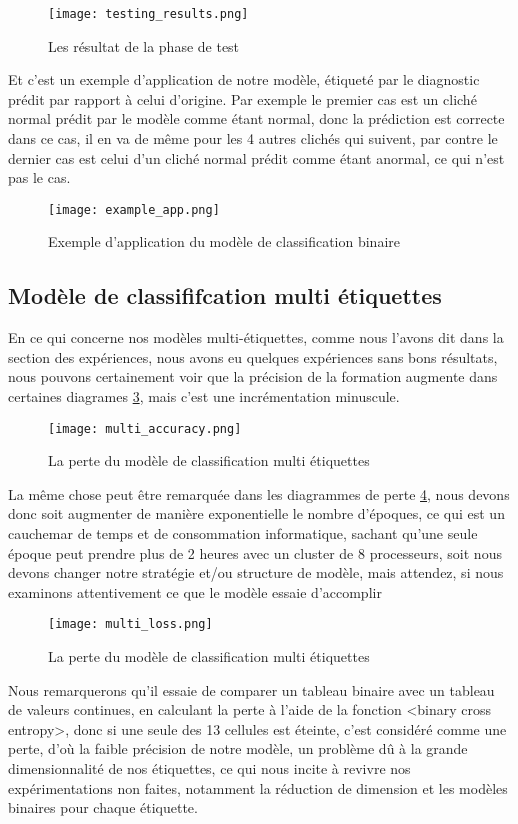         \begin{figure}[H]
            \centering
            \texttt{[image: testing\_results.png]}
            \caption{Les résultat de la phase de test}\label{fig:testing_results}
        \end{figure}
        Et c'est un exemple d'application de notre modèle, étiqueté par le diagnostic prédit par rapport à celui d'origine.
        Par exemple le premier cas est un cliché normal prédit par le modèle comme étant normal, donc la prédiction est correcte dans ce cas, il en va de même pour les 4 autres clichés qui suivent, par contre le dernier cas est celui d'un cliché normal prédit comme étant anormal, ce qui n'est pas le cas.
        \begin{figure}[H]
            \centering
            \texttt{[image: example\_app.png]}
            \caption{Exemple d'application du modèle de classification binaire}\label{fig:example_app}
        \end{figure}
    \subsection{Modèle de classififcation multi étiquettes}
        En ce qui concerne nos modèles multi-étiquettes, comme nous l'avons dit dans la section des expériences, nous avons eu quelques expériences sans bons résultats, nous pouvons certainement voir que la précision de la formation augmente dans certaines diagrames \ref{fig:multi_accuracy}, mais c'est une incrémentation minuscule.
        \begin{figure}[H]
            \centering
            \texttt{[image: multi\_accuracy.png]}
            \caption{La perte du modèle de classification multi étiquettes}\label{fig:multi_accuracy}
        \end{figure}
        La même chose peut être remarquée dans les diagrammes de perte \ref{fig:multi_loss}, nous devons donc soit augmenter de manière exponentielle le nombre d'époques, ce qui est un cauchemar de temps et de consommation informatique, sachant qu'une seule époque peut prendre plus de 2 heures avec un cluster de 8 processeurs, soit nous devons changer notre stratégie et/ou structure de modèle, mais attendez, si nous examinons attentivement ce que le modèle essaie d'accomplir
        \begin{figure}[H]
            \centering
            \texttt{[image: multi\_loss.png]}
            \caption{La perte du modèle de classification multi étiquettes}\label{fig:multi_loss}
        \end{figure}
        Nous remarquerons qu'il essaie de comparer un tableau binaire avec un tableau de valeurs continues, en calculant la perte à l'aide de la fonction <binary cross entropy>, donc si une seule des 13 cellules est éteinte, c'est considéré comme une perte, d'où la faible précision de notre modèle, un problème dû à la grande dimensionnalité de nos étiquettes, ce qui nous incite à revivre nos expérimentations non faites, notamment la réduction de dimension et les modèles binaires pour chaque étiquette.
        
